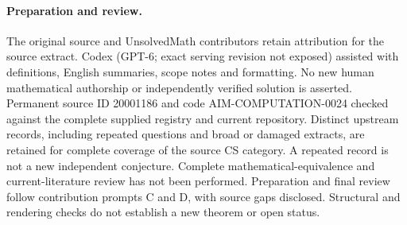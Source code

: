 \documentclass[11pt]{article}
\begin{document}
\paragraph{Preparation and review.}
The original source and UnsolvedMath contributors retain attribution for the source extract. Codex (GPT-6; exact serving revision not exposed) assisted with definitions, English summaries, scope notes and formatting. No new human mathematical authorship or independently verified solution is asserted. Permanent source ID 20001186 and code AIM-COMPUTATION-0024 checked against the complete supplied registry and current repository. Distinct upstream records, including repeated questions and broad or damaged extracts, are retained for complete coverage of the source CS category. A repeated record is not a new independent conjecture. Complete mathematical-equivalence and current-literature review has not been performed. Preparation and final review follow contribution prompts C and D, with source gaps disclosed. Structural and rendering checks do not establish a new theorem or open status.
\label{end:20001186}
\end{document}
